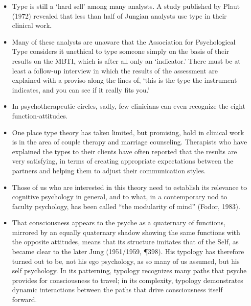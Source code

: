 \begin{itemize}

\item Type is still a `hard sell' among many analysts. A study published by Plaut (1972)
revealed that less than half of Jungian analysts use type in their clinical work.

\item Many of these analysts are unaware that the Association for Psychological
Type considers it unethical to type someone simply on the basis of their
results on the MBTI, which is  after all only an `indicator.' There must be at
least a follow-up interview in which the results of the assessment are
explained with a proviso along the lines of, `this is the type the instrument
indicates, and you can see if it really fits you.'

\item In psychotherapeutic circles, sadly, few clinicians can even recognize
the eight function-attitudes.

\item One place type theory has taken limited, but promising, hold in clinical
work is in the area of couple therapy and marriage counseling. Therapists who
have explained the types to their clients have often reported that the results
are very satisfying, in terms of creating appropriate expectations between the
partners and helping them to adjust their communication styles.

\item Those of us who are interested in this theory need to establish its
relevance to cognitive psychology in general, and to what, in a contemporary
nod to faculty psychology, has been called ``the modularity of mind'' (Fodor,
1983).

\item That consciousness appears to the psyche as a quaternary of functions,
mirrored by an equally quaternary shadow showing the same functions with the
opposite attitudes, means that its structure imitates that of the Self, as
became clear to the later Jung (1951/1959, \P 398). His typology has therefore
turned out to be, not his ego psychology, as so many of us assumed, but his
self psychology. In its patterning, typology recognizes many paths that psyche
provides for consciousness to travel; in its complexity, typology demonstrates
dynamic interactions between the paths that drive consciousness itself forward.

\end{itemize}

